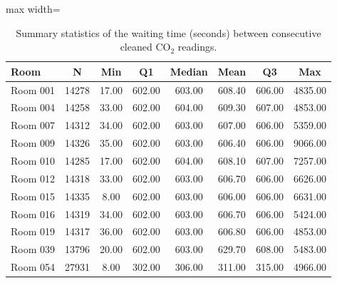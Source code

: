 \begin{table}[ht]
\centering
\begin{adjustbox}{max width=\textwidth}
\begin{tabular}{lccccccc}
\hline
Room & N & Min & Q1 & Median & Mean & Q3 & Max \\
\hline
Room 001 & 14278 & 17.00 & 602.00 & 603.00 & 608.40 & 606.00 & 4835.00 \\
Room 004 & 14258 & 33.00 & 602.00 & 604.00 & 609.30 & 607.00 & 4853.00 \\
Room 007 & 14312 & 34.00 & 602.00 & 603.00 & 607.00 & 606.00 & 5359.00 \\
Room 009 & 14326 & 35.00 & 602.00 & 603.00 & 606.40 & 606.00 & 9066.00 \\
Room 010 & 14285 & 17.00 & 602.00 & 604.00 & 608.10 & 607.00 & 7257.00 \\
Room 012 & 14318 & 33.00 & 602.00 & 603.00 & 606.70 & 606.00 & 6626.00 \\
Room 015 & 14335 & 8.00 & 602.00 & 603.00 & 606.00 & 606.00 & 6631.00 \\
Room 016 & 14319 & 34.00 & 602.00 & 603.00 & 606.70 & 606.00 & 5424.00 \\
Room 019 & 14317 & 36.00 & 602.00 & 603.00 & 606.80 & 606.00 & 4853.00 \\
Room 039 & 13796 & 20.00 & 602.00 & 603.00 & 629.70 & 608.00 & 5483.00 \\
Room 054 & 27931 & 8.00 & 302.00 & 306.00 & 311.00 & 315.00 & 4966.00 \\
\hline
\end{tabular}
\end{adjustbox}
\caption{Summary statistics of the waiting time (seconds) between consecutive cleaned CO$_2$ readings.}
\label{tab:raw_waiting_times}
\end{table}
